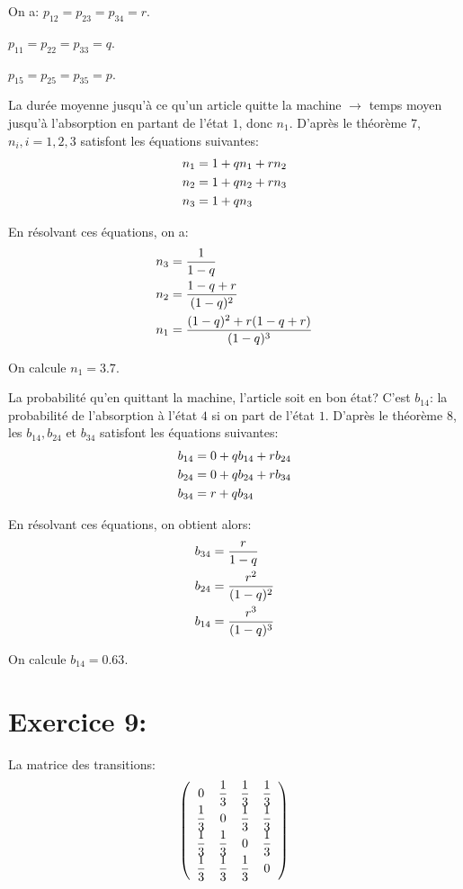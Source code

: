 \documentclass[a4paper,twoside,12pt]{article}
\begin{document}
On a: $p_{12} = p_{23} = p_{34} = r$.

$p_{11} = p_{22} = p_{33} = q$.

$p_{15} = p_{25} = p_{35} = p$.

La durée moyenne jusqu'à ce qu'un article quitte la machine $\rightarrow$ temps moyen jusqu'à l'absorption en partant de l'état $1$, donc $n_1$. D'après le théorème $7$, $n_i, i=1,2,3$ satisfont les équations suivantes:
\begin{align}
    n_1 &= 1 + qn_1 + rn_2 \notag \\
    n_2 &= 1 + qn_2 + rn_3 \notag \\
    n_3 &= 1 + qn_3 \notag
\end{align}

En résolvant ces équations, on a:
\begin{align}
    n_3 &= \dfrac{1}{1-q} \notag \\
    n_2 &= \dfrac{1-q+r}{(1-q)^2} \notag \\
    n_1 &= \dfrac{(1-q)^2 + r(1-q+r)}{(1-q)^3}\notag
\end{align}

On calcule $n_1 = 3.7$.

La probabilité qu'en quittant la machine, l'article soit en bon état? C'est $b_{14}$: la probabilité de l'absorption à l'état $4$ si on part de l'état $1$. D'après le théorème $8$, les $b_{14}, b_{24}$ et $b_{34}$ satisfont les équations suivantes:
\begin{align}
    b_{14} &= 0 + qb_{14} + rb_{24} \notag \\
    b_{24} &= 0 + qb_{24} + rb_{34} \notag \\
    b_{34} &= r + qb_{34} \notag
\end{align}

En résolvant ces équations, on obtient alors:
\begin{align}
    b_{34} &= \dfrac{r}{1-q}\notag \\
    b_{24} &= \dfrac{r^2}{(1-q)^2}\notag \\
    b_{14} &= \dfrac{r^3}{(1-q)^3} \notag
\end{align}

On calcule $b_{14} = 0.63$.

\section{Exercice 9:}
La matrice des transitions:
\begin{align}
    \left(\begin{array}{cccc}
        0 & \dfrac{1}{3} & \dfrac{1}{3} & \dfrac{1}{3} \\
        \dfrac{1}{3} & 0 & \dfrac{1}{3} & \dfrac{1}{3} \\
        \dfrac{1}{3} & \dfrac{1}{3} & 0 & \dfrac{1}{3} \\
        \dfrac{1}{3} & \dfrac{1}{3} & \dfrac{1}{3} & 0
    \end{array}\right) \notag
\end{align}
\end{document}
